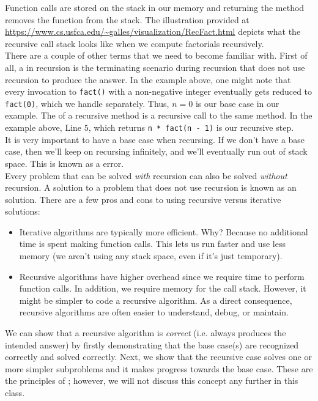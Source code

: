Function calls are stored on the stack in our memory and returning the method removes the function from the stack. The illustration provided at \url{https://www.cs.usfca.edu/~galles/visualization/RecFact.html} depicts what the recursive call stack looks like when we compute factorials recursively. \\


There are a couple of other terms that we need to become familiar with. First of all, a  in recursion is the terminating scenario during recursion that does not use recursion to produce the answer. In the example above, one might note that every invocation to \verb!fact()! with a non-negative integer eventually gets reduced to \verb!fact(0)!, which we handle separately.  Thus, $n = 0$ is our base case in our example. The  of a recursive method is a recursive call to the same method. In the example above, Line $5$, which returns \verb!n * fact(n - 1)! is our recursive step. \\

It is very important to have a base case when recursing. If we don't have a base case, then we'll keep on recursing infinitely, and we'll eventually run out of stack space. This is known as a  error. \\

Every problem that can be solved \textit{with} recursion can also be solved \textit{without} recursion. A solution to a problem that does not use recursion is known as an  solution. There are a few pros and cons to using recursive versus iterative solutions:

\begin{itemize}
    \item Iterative algorithms are typically more efficient. Why? Because no additional time is spent making function calls. This lets us run faster and use less memory (we aren't using any stack space, even if it's just temporary).
    \item Recursive algorithms have higher overhead since we require time to perform function calls. In addition, we require memory for the call stack. However, it might be simpler to code a recursive algorithm. As a direct consequence, recursive algorithms are often easier to understand, debug, or maintain. 
\end{itemize}

\begin{example}
We can show that a recursive algorithm is \textit{correct} (i.e. always produces the intended answer) by firstly demonstrating that the base case(s) are recognized correctly and solved correctly. Next, we show that the recursive case solves one or more simpler subproblems and it makes progress towards the base case. These are the principles of ; however, we will not discuss this concept any further in this class.
\end{example}

